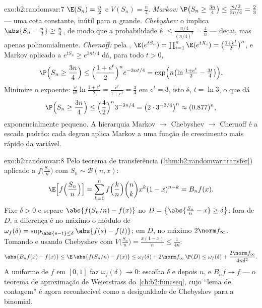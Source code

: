 \begin{solution}{exo:b2:randomvar:7}
$\E(S_n) = \frac n2$ e $V(S_n) = \frac n4$.
\emph{Markov:} $\P\bigl(S_n \geq \frac{3n}4\bigr) \leq
\frac{n/2}{3n/4} = \frac23$ --- uma cota constante, inútil para
$n$ grande.
\emph{Chebyshev:} o  implica $\abs{S_n - \frac n2} \geq
\frac n4$, de modo que a probabilidade é $\leq \frac{n/4}{(n/4)^2} =
\frac4n$ --- decai, mas apenas polinomialmente.
\emph{Chernoff:} pela , $\E(e^{tS_n}) =
\prod_{i=1}^n\E(e^{tX_i}) = \bigl(\frac{1 + e^t}{2}\bigr)^n$, e
Markov aplicado a $e^{tS_n} \geq e^{3nt/4}$ dá, para todo $t >
0$,
\[
\P\Bigl(S_n \geq \frac{3n}4\Bigr)
\leq \Bigl(\frac{1 + e^t}{2}\Bigr)^n e^{-3nt/4}
= \exp\Bigl(n\bigl(\ln\tfrac{1 + e^t}{2} - \tfrac{3t}4\bigr)\Bigr).
\]
Minimize o expoente: $\frac{\dd}{\dd t}\ln\frac{1+e^t}{2} =
\frac{e^t}{1 + e^t} = \frac34$ em $e^t = 3$, isto é, $t = \ln 3$,
o que dá
\[
\P\Bigl(S_n \geq \frac{3n}4\Bigr)
\leq \Bigl(\frac{4}{2}\Bigr)^n 3^{-3n/4}
= \bigl(2 \cdot 3^{-3/4}\bigr)^n \approx (0.877)^n ,
\]
exponencialmente pequeno. A hierarquia Markov $\to$ Chebyshev $\to$
Chernoff é a escada padrão: cada degrau aplica Markov a uma
função de crescimento mais rápido da variável.
\end{solution}

\begin{solution}{exo:b2:randomvar:8}
Pelo teorema de transferência (\cref{thm:b2:randomvar:transfer})
aplicado a $f\bigl(\frac{S_n}{n}\bigr)$ com $S_n \sim
\mathcal{B}(n, x)$:
\[
\E\Bigl[f\Bigl(\frac{S_n}{n}\Bigr)\Bigr]
= \sum_{k=0}^n f\Bigl(\frac kn\Bigr)\binom nk x^k(1-x)^{n-k}
= B_nf(x) .
\]
Fixe $\delta > 0$ e separe $\abs{f(S_n/n) - f(x)}$ no  $D
= \bigl\{\abs{\frac{S_n}{n} - x} \geq \delta\bigr\}$:
fora de $D$, a diferença é no máximo o módulo de 
$\omega_f(\delta) = \sup_{\abs{s - t}\leq\delta}\abs{f(s) -
f(t)}$; em $D$, no máximo $2\norm f_\infty$. Tomando  e
usando Chebyshev com $V\bigl(\frac{S_n}{n}\bigr) =
\frac{x(1-x)}{n} \leq \frac{1}{4n}$:
\[
\abs{B_nf(x) - f(x)}
\leq \E\,\abs{f(S_n/n) - f(x)}
\leq \omega_f(\delta)
+ 2\norm f_\infty\,\P(D)
\leq \omega_f(\delta) + \frac{2\norm f_\infty}{4n\delta^2} .
\]
A  uniforme de $f$ em $[0, 1]$ faz $\omega_f(\delta) \to
0$: escolha $\delta$ e depois $n$, e $B_nf \to f$  --- o
teorema de aproximação de Weierstrass do~\cref{ch:b2:funcseq}, cujo
``lema de contagem'' é agora reconhecível como a desigualdade de Chebyshev
para a  binomial.
\end{solution}

